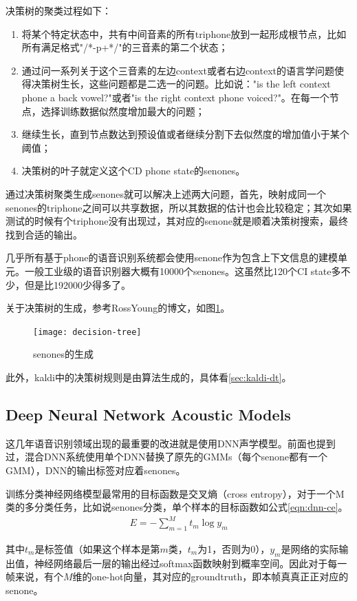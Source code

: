 决策树的聚类过程如下：
\begin{enumerate}
	\item 将某个特定状态中，共有中间音素的所有triphone放到一起形成根节点，比如所有满足格式"/*-p+*/"的三音素的第二个状态；
	\item 通过问一系列关于这个三音素的左边context或者右边context的语言学问题使得决策树生长，这些问题都是二选一的问题。比如说："is the left context phone a back vowel?"或者"is the right context phone voiced?"。在每一个节点，选择训练数据似然度增加最大的问题；
	\item 继续生长，直到节点数达到预设值或者继续分割下去似然度的增加值小于某个阈值；
	\item 决策树的叶子就定义这个CD phone state的senones。
\end{enumerate}

通过决策树聚类生成senones就可以解决上述两大问题，首先，映射成同一个senones的triphone之间可以共享数据，所以其数据的估计也会比较稳定；其次如果测试的时候有个triphone没有出现过，其对应的senone就是顺着决策树搜索，最终找到合适的输出。


几乎所有基于phone的语音识别系统都会使用senone作为包含上下文信息的建模单元。一般工业级的语音识别器大概有10000个senones。这虽然比120个CI state多不少，但是比192000少得多了。

关于决策树的生成，参考RossYoung的博文，如图\ref{fig:decision-tree}。
\begin{figure}[htbp]
	\centering
	\texttt{[image: decision-tree]}
	\caption{senones的生成\label{fig:decision-tree}}
\end{figure}

此外，kaldi中的决策树规则是由算法生成的，具体看\ref{sec:kaldi-dt}。

\subsection{Deep Neural Network Acoustic Models} 
这几年语音识别领域出现的最重要的改进就是使用DNN声学模型。前面也提到过，混合DNN系统使用单个DNN替换了原先的GMMs（每个senone都有一个GMM），DNN的输出标签对应着senones。

训练分类神经网络模型最常用的目标函数是交叉熵（cross entropy），对于一个M类的多分类任务，比如说senones分类，单个样本的目标函数如公式\ref{eqn:dnn-ce}。
\begin{align}
\label{eqn:dnn-ce}
E = -\sum_{m=1}^{M} t_m\log{y_m}
\end{align}

其中$t_m$是标签值（如果这个样本是第$m$类，$t_m$为1，否则为0），$y_m$是网络的实际输出值，神经网络最后一层的输出经过softmax函数映射到概率空间。因此对于每一帧来说，有个$M$维的one-hot向量，其对应的groundtruth，即本帧真真正正对应的senone。

